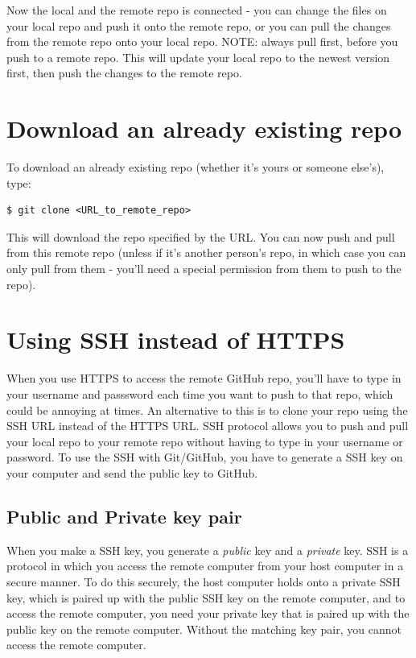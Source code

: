 \documentclass[a4paper, 12pt]{article}
\begin{document}
Now the local and the remote repo is connected - you can change the files on your local repo and push it onto the remote repo, or you can pull the changes from the remote repo onto your local repo.
NOTE: always pull first, before you push to a remote repo.
This will update your local repo to the newest version first, then push the changes to the remote repo.

\section*{Download an already existing repo}
\label{sec:clonerepo}

To download an already existing repo (whether it's yours or someone else's), type:
\begin{lstlisting}
$ git clone <URL_to_remote_repo>
\end{lstlisting}
This will download the repo specified by the URL.
You can now push and pull from this remote repo (unless if it's another person's repo, in which case you can only pull from them - you'll need a special permission from them to push to the repo).

\section*{Using SSH instead of HTTPS}

When you use HTTPS to access the remote GitHub repo, you'll have to type in your username and passsword each time you want to push to that repo, which could be annoying at times.
An alternative to this is to clone your repo using the SSH URL instead of the HTTPS URL.
SSH protocol allows you to push and pull your local repo to your remote repo without having to type in your username or password.
To use the SSH with Git/GitHub, you have to generate a SSH key on your computer and send the public key to GitHub.

\subsection*{Public and Private key pair}

When you make a SSH key, you generate a {\itshape public} key and a {\itshape private} key.
SSH is a protocol in which you access the remote computer from your host computer in a secure manner.
To do this securely, the host computer holds onto a private SSH key, which is paired up with the public SSH key on the remote computer, and to access the remote computer, you need your private key that is paired up with the public key on the remote computer.
Without the matching key pair, you cannot access the remote computer.
\end{document}
